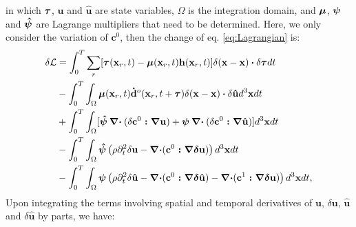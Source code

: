 in which $\boldsymbol{{}\tau}$, $\mathbf{u}$ and $\mathbf{\hat{u}}$ are state variables, 
$\Omega$ is the integration domain, 
and 
$\boldsymbol{{}\mu}$, $\boldsymbol{{}\psi}$ and $\boldsymbol{{}\hat \psi}$ are Lagrange multipliers that need to be determined.
Here, we only consider the variation of $\mathbf{c}^0$, then the change of eq.
\eqref{eq:Lagrangian} is: 
\begin{equation}
	\begin{split}
		\delta\mathcal{L}
		&=\int^T_0\sum_{r}[\boldsymbol{{}\tau}(\mathbf{x}_r,t)-\boldsymbol{{}\mu}(\mathbf{x}_r,t)\mathbf{h}(\mathbf{x}_r,t)]\delta(\mathbf{x}-\mathbf{x})\boldsymbol{{}\cdot}\delta
		\boldsymbol{{}\tau}dt \\
		&-\int^T_0\int_{\Omega}
		\boldsymbol{{}\mu}(\mathbf{x}_r,t)\mathbf{\dot{d}}^o(\mathbf{x}_r,t+\boldsymbol{{}\tau})\delta(\mathbf{x}-\mathbf{x})\boldsymbol{{}\cdot}\delta
		\mathbf{\hat{u}}d^3\mathbf{x}dt\\
		&+\int^T_0\int_{\Omega}[
		\boldsymbol{{}\hat \psi}\boldsymbol{{}\nabla\cdot}(\delta \mathbf{c}^0
		\boldsymbol{{}:\nabla\mathbf{u}})
		+
		\boldsymbol{{}\psi}\boldsymbol{{}\nabla\cdot}(\delta \mathbf{c}^0
		\boldsymbol{{}:\nabla\mathbf{\hat{u}}})]
		d^3\mathbf{x}dt\\
	&-\int^T_0\int_{\Omega} \boldsymbol{{}\hat \psi}\left(\rho\partial^2_t \delta\mathbf{u} -\boldsymbol{{}\nabla
	\cdot}
	(\boldsymbol{{}\mathbf{c}}^0\boldsymbol{{}:\nabla\delta\mathbf{u}})\right)d^3\mathbf{x}dt\\
	&-\int^T_0\int_{\Omega} \boldsymbol{{}\psi}\left(\rho\partial^2_t
	\delta\mathbf{\hat{u}}-\boldsymbol{{}\nabla\cdot}(\boldsymbol{{}\mathbf{c}}^0\boldsymbol{{}:\nabla\delta\mathbf{\hat{u}}})-
	\boldsymbol{{}\nabla\cdot}(\mathbf{c}^1\boldsymbol{{}:\nabla\delta\mathbf{u}})\right)d^3\mathbf{x}dt,
	\end{split}
        \label{eq:DeltaLagrangian1}
\end{equation}
Upon integrating the terms involving spatial and temporal derivatives of $\mathbf{u}$,
$\delta\mathbf{u}$, $\mathbf{\hat{u}}$ and $\delta\mathbf{\hat{u}}$
by parts, we have:
